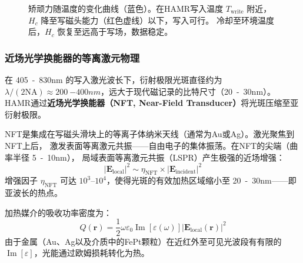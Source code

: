 \documentclass[11pt,a4paper,twoside]{article}
\newcommand{\degC}{\ensuremath{{}^{\circ}\mathrm{C}}}
\theoremstyle{definition}
\theoremstyle{plain}
\theoremstyle{remark}
\begin{document}
\begin{figure}[H]
\centering
{}
\caption{矫顽力随温度的变化曲线（蓝色）。在HAMR写入温度 $T_{\text{write}}$ 附近，
$H_c$ 降至写磁头能力（红色虚线）以下，写入可行。
冷却至环境温度后，$H_c$ 恢复至远高于写场，数据稳定。}
\label{fig:hc-vs-t}
\end{figure}

\subsubsection{近场光学换能器的等离激元物理}

在 \SI{405}{-830}{nm} 的写入激光波长下，衍射极限光斑直径约为 $\lambda/(2\text{NA}) \approx
\SI{200}{-400}{nm}$，远大于现代磁记录的比特尺寸（\SI{20}{-30}{nm}）。
HAMR通过\textbf{近场光学换能器（NFT, Near-Field Transducer）}将光斑压缩至亚衍射极限。

NFT是集成在写磁头滑块上的等离子体纳米天线（通常为Au或Ag）。激光聚焦到NFT上后，
激发表面等离激元共振——自由电子的集体振荡。在NFT的尖端（曲率半径 \SI{5}{-10}{nm}），
局域表面等离激元共振（LSPR）产生极强的近场增强：
\begin{equation}
  |\mathbf{E}_{\text{local}}|^2 \sim \eta_{\text{NFT}} \times |\mathbf{E}_{\text{incident}}|^2
\end{equation}
增强因子 $\eta_{\text{NFT}}$ 可达 $10^3$--$10^4$，使得光斑的有效加热区域缩小至
\SI{20}{-30}{nm}——即亚波长的热点。

加热媒介的吸收功率密度为：
\begin{equation}
  Q(\mathbf{r}) = \frac{1}{2} \omega \varepsilon_0 \operatorname{Im}[\varepsilon(\omega)]
                 |\mathbf{E}_{\text{local}}(\mathbf{r})|^2
\end{equation}
由于金属（Au、Ag以及介质中的FePt颗粒）在近红外至可见光波段有有限的
$\operatorname{Im}[\varepsilon]$，光能通过欧姆损耗转化为热。
\end{document}
